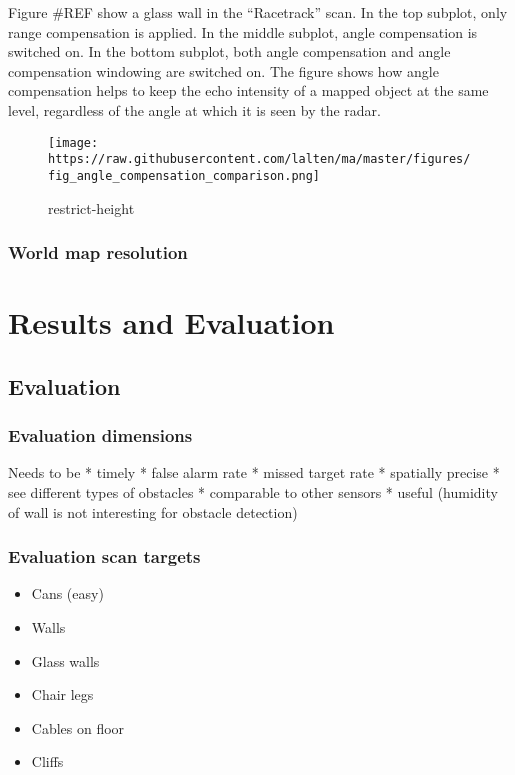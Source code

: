 Figure \#REF show a glass wall in the ``Racetrack'' scan. In the top
subplot, only range compensation is applied. In the middle subplot,
angle compensation is switched on. In the bottom subplot, both angle
compensation and angle compensation windowing are switched on. The
figure shows how angle compensation helps to keep the echo intensity of
a mapped object at the same level, regardless of the angle at which it
is seen by the radar.

\begin{figure}
\centering
\texttt{[image: https://raw.githubusercontent.com/lalten/ma/master/figures/fig\_angle\_compensation\_comparison.png]}
\caption{restrict-height}
\end{figure}

\subsubsection{World map resolution}\label{world-map-resolution}

\section{Results and Evaluation}\label{results-and-evaluation}

\subsection{Evaluation}\label{evaluation}

\subsubsection{Evaluation dimensions}\label{evaluation-dimensions}

Needs to be * timely * false alarm rate * missed target rate * spatially
precise * see different types of obstacles * comparable to other sensors
* useful (humidity of wall is not interesting for obstacle detection)

\subsubsection{Evaluation scan targets}\label{evaluation-scan-targets}

\begin{itemize}
\tightlist
\item
  Cans (easy)
\item
  Walls
\item
  Glass walls
\item
  Chair legs
\item
  Cables on floor
\item
  Cliffs
\end{itemize}

